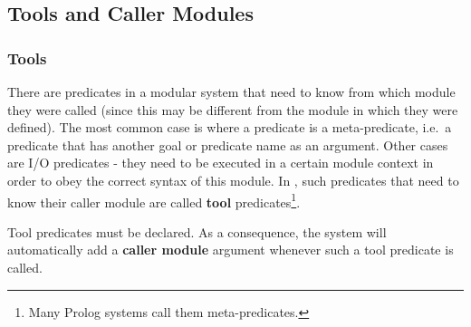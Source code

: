 \subsection{Tools and Caller Modules}

\subsubsection{Tools}
\label{tools}
There are predicates in a modular system that need to know from which
module they were called (since this may be different from the module
in which they were defined).
The most common case is where a predicate is a meta-predicate,
i.e.\ a predicate that has another goal or predicate name as an argument.
Other cases are I/O predicates - they need to be executed in a
certain module context in order to obey the correct syntax of this module.
In {\eclipse}, such predicates that need to know their caller module
are called {\bf tool} predicates\footnote{
    Many Prolog systems call them meta-predicates.}.

Tool predicates must be declared.  As a consequence, the system will
automatically add a {\bf caller module} argument whenever such a tool
predicate is called.

